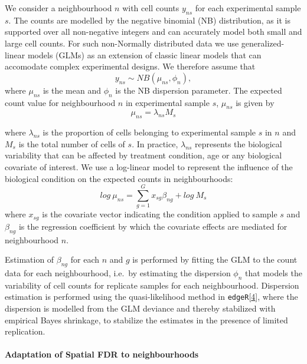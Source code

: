 \documentclass[
]{article}
\begin{document}
We consider a neighbourhood \(n\) with cell counts \(y_{ns}\) for each experimental sample \(s\). The counts are modelled by the negative binomial (NB) distribution, as it is supported over all non-negative integers and can accurately model both small and large cell counts. For such non-Normally distributed data we use generalized-linear models (GLMs) as an extension of classic linear models that can accomodate complex experimental designs. We therefore assume that
\[
y_{ns} \sim NB(\mu_{ns},\phi_{n}),
\]
where \(\mu_{ns}\) is the mean and \(\phi_{n}\) is the NB dispersion parameter.
The expected count value for neighbourhood \(n\) in experimental sample \(s\), \(\mu_{ns}\) is given by
\[
\mu_{ns} = \lambda_{ns}M_s
\]

where \(\lambda_{ns}\) is the proportion of cells belonging to experimental sample \(s\) in \(n\) and \(M_s\) is the total number of cells of \(s\). In practice, \(\lambda_{ns}\) represents the biological variability that can be affected by treatment condition, age or any biological covariate of interest. We use a log-linear model to represent the influence of the biological condition on the expected counts in neighbourhoods:
\[
log\ \mu_{ns} = \sum_{g=1}^{G}x_{sg}\beta_{ng} + log\ M_s
\]
where \(x_{sg}\) is the covariate vector indicating the condition applied to sample \(s\) and \(\beta_{ng}\) is the regression coefficient by which the covariate effects are mediated for neighbourhood \(n\).

Estimation of \(\beta_{ng}\) for each \(n\) and \(g\) is performed by fitting the GLM to the count data for each neighbourhood, i.e.~by estimating the dispersion \(\phi_{n}\) that models the variability of cell counts for replicate samples for each neighbourhood. Dispersion estimation is performed using the quasi-likelihood method in \texttt{edgeR}{[}\protect\hyperlink{ref-robinsonEdgeRBioconductorPackage2010a}{4}{]}, where the dispersion is modelled from the GLM deviance and thereby stabilized with empirical Bayes shrinkage, to stabilize the estimates in the presence of limited replication.

\hypertarget{adaptation-of-spatial-fdr-to-neighbourhoods}{%
\paragraph*{Adaptation of Spatial FDR to neighbourhoods}\label{adaptation-of-spatial-fdr-to-neighbourhoods}}
\end{document}
